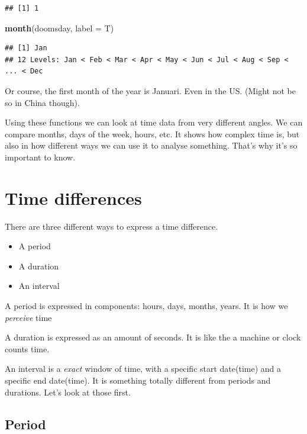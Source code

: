 \documentclass[]{tufte-book}
\newenvironment{Shaded}{}{}
\newcommand{\DataTypeTok}[1]{\textcolor[rgb]{0.56,0.13,0.00}{#1}}
\newcommand{\KeywordTok}[1]{\textcolor[rgb]{0.00,0.44,0.13}{\textbf{#1}}}
\newcommand{\NormalTok}[1]{#1}
\providecommand{\tightlist}{%
  \setlength{\itemsep}{0pt}\setlength{\parskip}{0pt}}
\begin{document}
\begin{verbatim}
## [1] 1
\end{verbatim}

\begin{Shaded}
\begin{Highlighting}[]
\KeywordTok{month}\NormalTok{(doomsday, }\DataTypeTok{label =}\NormalTok{ T)}
\end{Highlighting}
\end{Shaded}

\begin{verbatim}
## [1] Jan
## 12 Levels: Jan < Feb < Mar < Apr < May < Jun < Jul < Aug < Sep < ... < Dec
\end{verbatim}

Or course, the first month of the year is Januari. Even in the US. (Might not be so in China though).

Using these functions we can look at time data from very different angles. We can compare months, days of the week, hours, etc. It shows how complex time is, but also in how different ways we can use it to analyse something. That's why it's so important to know.

\hypertarget{time-differences}{%
\section{Time differences}\label{time-differences}}

There are three different ways to express a time difference.

\begin{itemize}
\tightlist
\item
  A period
\item
  A duration
\item
  An interval
\end{itemize}

A period is expressed in components: hours, days, months, years. It is how we \emph{perceive} time

A duration is expressed as an amount of seconds. It is like the a machine or clock counts time.

An interval is a \emph{exact} window of time, with a specific start date(time) and a specific end date(time). It is something totally different from periods and durations. Let's look at those first.

\hypertarget{period-1}{%
\subsection{Period}\label{period-1}}
\end{document}
